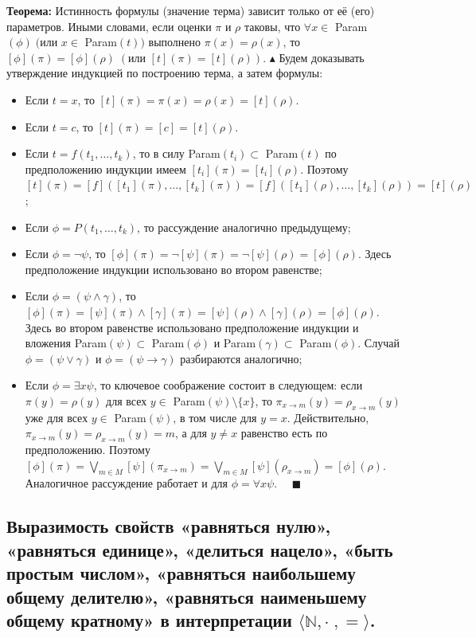 \textbf{Теорема:} Истинность формулы (значение терма) зависит только от её (его) параметров. Иными словами, если оценки $\pi$ и $\rho$ таковы, что $\forall x \in $ Param$(\phi) \;
(\text{или }x \in $ Param$(t))$ выполнено $\pi(x) = \rho(x)$, то $[\phi](\pi) = [\phi](\rho) \; (\text{или }[t](\pi) = [t](\rho))$.
\newline $\blacktriangle$ Будем доказывать утверждение индукцией по построению терма, а затем формулы:
\begin{itemize}
    \item Если $t = x$, то $[t](\pi) = \pi(x) = \rho(x) = [t](\rho)$.
    \item Если $t = c$, то $[t](\pi) = [c] = [t](\rho)$.
    \item Если $t = f(t_1,\ldots, t_k)$, то в силу Param$(t_i) \subset$ Param$(t)$ по предположению индукции имеем $[t_i](\pi) = [t_i](\rho)$. Поэтому $[t](\pi) = [f]([t_1](\pi),\ldots, [t_k](\pi)) = [f]([t_1](\rho),\ldots, [t_k](\rho)) = [t](\rho)$;
    \item Если $\phi = P(t_1,\ldots, t_k)$, то рассуждение аналогично предыдущему;
    \item Если $\phi = \neg\psi$, то $[\phi](\pi) = \neg[\psi](\pi) = \neg[\psi](\rho) = [\phi](\rho)$. Здесь предположение индукции использовано во втором равенстве;
    \item Если $\phi = (\psi \land\gamma)$, то $[\phi](\pi) = [\psi](\pi) \land [\gamma](\pi) = [\psi](\rho) \land [\gamma](\rho) = [\phi](\rho)$. Здесь во втором равенстве использовано предположение индукции и вложения Param$(\psi) \subset$ Param$(\phi)$ и Param$(\gamma) \subset$ Param$(\phi)$. Случай $\phi = (\psi \lor\gamma)$ и $\phi = (\psi \to\gamma)$ разбираются аналогично;
    \item Если $\phi = \exists x\psi$, то ключевое соображение состоит в следующем: если $\pi(y) = \rho(y)$ для всех $y \in$ Param$(\psi) \setminus \{x\}$, то $\pi_{x\to m}(y) = \rho_{x\to m}(y)$ уже для всех $y \in$ Param$(\psi)$, в том числе для $y = x$. Действительно, $\pi_{x\to m}(y) = \rho_{x\to m}(y) = m$, а для $y\neq x$ равенство есть по предположению. Поэтому $[\phi](\pi) = \bigvee_{m\in M}[\psi](\pi_{x\to m}) = \bigvee_{m\in M}[\psi](\rho_{x\to m})=[\phi](\rho)$. Аналогичное рассуждение работает и для $\phi = \forall x\psi$. $\quad \blacksquare$
\end{itemize}

\subsection{Выразимость свойств «равняться нулю», «равняться единице», «делиться нацело», «быть простым числом», «равняться наибольшему общему делителю», «равняться наименьшему общему кратному» в интерпретации $\langle\mathbb{N},\cdot\;,=\rangle$.}

